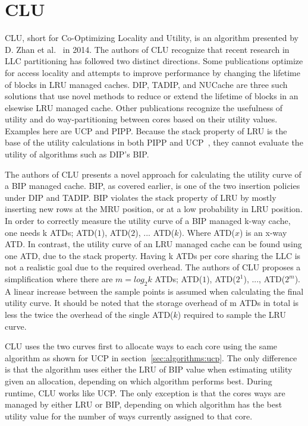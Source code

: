 
\section{CLU}
\label{sec:algorithms:clu}

CLU, short for Co-Optimizing Locality and Utility, is an algorithm presented by D. Zhan et al.~\cite{Zhan2014} in 2014.
The authors of CLU recognize that recent research in LLC partitioning has followed two distinct directions.
Some publications optimize for access locality and attempts to improve performance by changing the lifetime of blocks in LRU managed caches.
DIP, TADIP, and NUCache are three such solutions that use novel methods to reduce or extend the lifetime of blocks in an elsewise LRU managed cache.
Other publications recognize the usefulness of utility and do way-partitioning between cores based on their utility values.
Examples here are UCP and PIPP.
Because the stack property of LRU is the base of the utility calculations in both PIPP and UCP~\cite{Qureshi2006, Xie2009}, they cannot evaluate the utility of algorithms such as DIP's BIP.

The authors of CLU presents a novel approach for calculating the utility curve of a BIP managed cache.
BIP, as covered earlier, is one of the two insertion policies under DIP and TADIP. 
BIP violates the stack property of LRU by mostly inserting new rows at the MRU position, or at a low probability in LRU position.
In order to correctly measure the utility curve of a BIP managed k-way cache, one needs k ATDs; ATD($1$), ATD($2$), ... ATD($k$). 
Where ATD($x$) is an x-way ATD.
In contrast, the utility curve of an LRU managed cache can be found using one ATD, due to the stack property.
Having k ATDs per core sharing the LLC is not a realistic goal due to the required overhead.
The authors of CLU proposes a simplification where there are $m = log_2 k$ ATDs; ATD($1$), ATD($2^1$), ..., ATD($2^m$).
A linear increase between the sample points is assumed when calculating the final utility curve.
It should be noted that the storage overhead of m ATDs in total is less the twice the overhead of the single ATD($k$) required to sample the LRU curve.

CLU uses the two curves first to allocate ways to each core using the same algorithm as shown for UCP in section~\ref{sec:algorithms:ucp}.
The only difference is that the algorithm uses either the LRU of BIP value when estimating utility given an allocation, depending on which algorithm performs best.
During runtime, CLU works like UCP.
The only exception is that the cores ways are managed by either LRU or BIP, depending on which algorithm has the best utility value for the number of ways currently assigned to that core.

